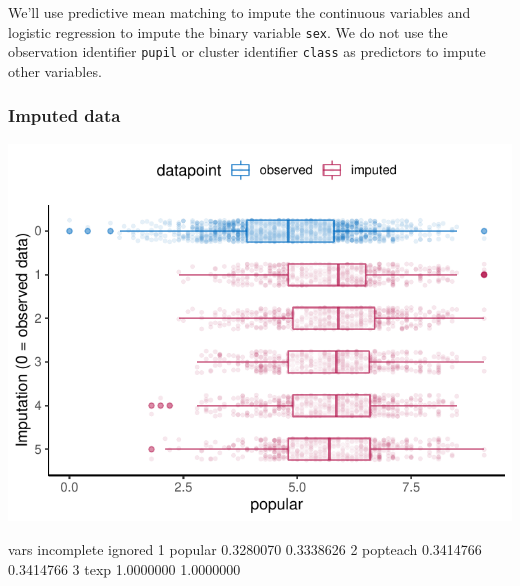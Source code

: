 \documentclass[
]{jss}
\begin{document}
We'll use predictive mean matching to impute the continuous variables
and logistic regression to impute the binary variable \texttt{sex}. We
do not use the observation identifier \texttt{pupil} or cluster
identifier \texttt{class} as predictors to impute other variables.

\begin{CodeChunk}
\end{CodeChunk}

\hypertarget{imputed-data}{%
\subsubsection{Imputed data}\label{imputed-data}}

\begin{CodeChunk}


\begin{center}\includegraphics{Manuscript_files/figure-latex/pop_ignored_eval-1} \end{center}

\begin{CodeOutput}
      vars incomplete   ignored
1  popular  0.3280070 0.3338626
2 popteach  0.3414766 0.3414766
3     texp  1.0000000 1.0000000
\end{CodeOutput}
\end{CodeChunk}
\end{document}
